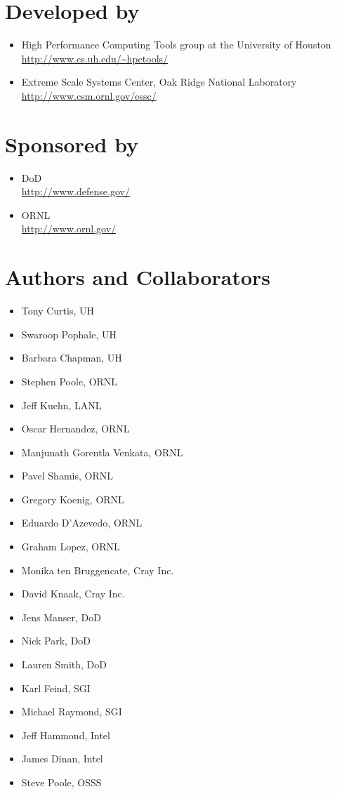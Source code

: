 \vfill{}

\section*{Developed by}
\begin{itemize}
\item High Performance Computing Tools group at the University of Houston\\
  \url{http://www.cs.uh.edu/~hpctools/} 
\item Extreme Scale Systems Center, Oak Ridge National Laboratory\\
  \url{http://www.csm.ornl.gov/essc/} 
\end{itemize}
\pagebreak{}

\section*{Sponsored by}
\begin{itemize}
\item \ac{DoD}\\
  \url{http://www.defense.gov/ }
\item \ac{ORNL}\\
  \url{http://www.ornl.gov/} 
\end{itemize}

\section*{Authors and Collaborators}
\begin{itemize}
\item Tony Curtis, \ac{UH}
\item Swaroop Pophale, \ac{UH}
\item Barbara Chapman, \ac{UH} 
\item Stephen Poole, \ac{ORNL}
\item Jeff Kuehn, \ac{LANL}
\item Oscar Hernandez, \ac{ORNL}
\item Manjunath Gorentla Venkata, \ac{ORNL}
\item Pavel Shamis, \ac{ORNL}
\item Gregory Koenig, \ac{ORNL}
\item Eduardo D'Azevedo, \ac{ORNL}
\item Graham Lopez, \ac{ORNL}
\item Monika ten Bruggencate, Cray Inc.
\item David Knaak, Cray Inc.
\item Jens Manser, \ac{DoD}
\item Nick Park, \ac{DoD}
\item Lauren Smith, \ac{DoD}
\item Karl Feind, SGI
\item Michael Raymond, SGI
\item Jeff Hammond, Intel
\item James Dinan, Intel
\item Steve Poole, OSSS
\end{itemize}

